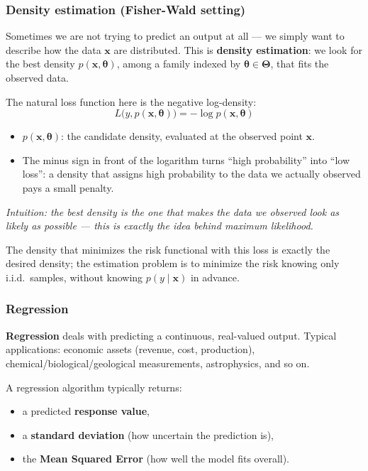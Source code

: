 \subsubsection{Density estimation (Fisher-Wald setting)}

Sometimes we are not trying to predict an output at all — we simply want to describe how the data $\mathbf{x}$ are distributed. This is \textbf{density estimation}: we look for the best density $p(\mathbf{x}, \boldsymbol\theta)$, among a family indexed by $\boldsymbol\theta \in \boldsymbol\Theta$, that fits the observed data.

The natural loss function here is the negative log-density:
\[
  L\bigl(y, p(\mathbf{x}, \boldsymbol\theta)\bigr) = -\log p(\mathbf{x}, \boldsymbol\theta)
\]
\begin{itemize}
  \item $p(\mathbf{x}, \boldsymbol\theta)$: the candidate density, evaluated at the observed point $\mathbf{x}$.
  \item The minus sign in front of the logarithm turns ``high probability'' into ``low loss'': a density that assigns high probability to the data we actually observed pays a small penalty.
\end{itemize}
\textit{Intuition: the best density is the one that makes the data we observed look as likely as possible — this is exactly the idea behind maximum likelihood.}

The density that minimizes the risk functional with this loss is exactly the desired density; the estimation problem is to minimize the risk knowing only i.i.d.\ samples, without knowing $p(y \mid \mathbf{x})$ in advance.

\subsubsection{Regression}

\textbf{Regression} deals with predicting a continuous, real-valued output. Typical applications: economic assets (revenue, cost, production), chemical/biological/geological measurements, astrophysics, and so on.

A regression algorithm typically returns:
\begin{itemize}
  \item a predicted \textbf{response value},
  \item a \textbf{standard deviation} (how uncertain the prediction is),
  \item the \textbf{Mean Squared Error} (how well the model fits overall).
\end{itemize}

